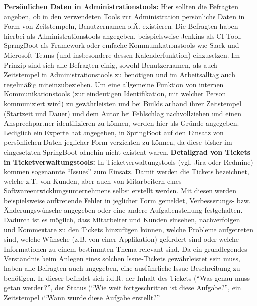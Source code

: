 \textbf{Persönlichen Daten in Administrationstools:} \newline
Hier sollten die Befragten angeben, ob in den verwendeten Tools zur Administration persönliche Daten in Form von Zeitstempeln, Benutzernamen o.Ä. existieren. Die Befragten haben hierbei als Administrationstools angegeben, beispielsweise Jenkins als CI-Tool, SpringBoot als Framework oder einfache Kommunikationstools wie Slack und Microsoft-Teams (und insbesondere dessen Kalenderfunktion)
einzusetzen. Im Prinzip sind sich alle Befragten einig, sowohl Benutzernamen, als auch Zeitstempel in Administrationstools zu benötigen und im Arbeitsalltag auch regelmäßig miteinzubeziehen. Um eine allgemeine Funktion von internen Kommunikationstools (zur eindeutigen Identifikation, mit welcher Person kommuniziert wird) zu gewährleisten und bei Builds anhand ihrer Zeitstempel (Startzeit und Dauer)
und dem Autor bei Fehlschlag nachvollziehen und einen Ansprechpartner identifizieren zu können, werden hier als Gründe angegeben. Lediglich ein Experte hat angegeben, in SpringBoot auf den Einsatz von persönlichen Daten jeglicher Form verzichten zu können, da diese bisher im eingesetzten SpringBoot ohnehin nicht existent waren. \newline \newline
\textbf{Detailgrad von Tickets in Ticketverwaltungstools:} \newline
In Ticketverwaltungstools (vgl. Jira oder Redmine) kommen sogenannte \enquote{Issues} zum Einsatz. Damit werden die Tickets bezeichnet, welche z.T. von Kunden, aber auch von Mitarbeitern eines Softwareentwicklungsunternehmens selbst erstellt werden. Mit diesen werden beispielsweise auftretende Fehler in jeglicher Form gemeldet, Verbesserungs- bzw. Änderungswünsche angegeben
oder eine andere Aufgabenstellung festgehalten. Dadurch ist es möglich, dass Mitarbeiter und Kunden einsehen, nachverfolgen und Kommentare zu den Tickets hinzufügen können, welche Probleme aufgetreten sind, welche Wünsche (z.B. von einer Applikation) gefordert sind oder welche Informationen zu einem bestimmten Thema relevant sind. Da ein grundlegendes Verständnis beim
Anlegen eines solchen Issue-Tickets gewährleistet sein muss, haben alle Befragten auch angegeben, eine ausführliche Issue-Beschreibung zu benötigen. In dieser befindet sich i.d.R. der Inhalt des Tickets (\enquote{Was genau muss getan werden?}, der Status (\enquote{Wie weit fortgeschritten ist diese Aufgabe?}, ein Zeitstempel (\enquote{Wann wurde diese Aufgabe erstellt?} 

